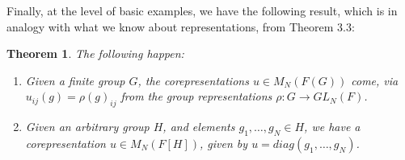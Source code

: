 \documentclass[12pt]{amsbook}
\newtheorem{theorem}{Theorem}[chapter]
\begin{document}
Finally, at the level of basic examples, we have the following result, which is in analogy with what we know about representations, from Theorem 3.3:

\begin{theorem}
The following happen:
\begin{enumerate}
\item Given a finite group $G$, the corepresentations $u\in M_N(F(G))$ come, via $u_{ij}(g)=\rho(g)_{ij}$ from the group representations $\rho:G\to GL_N(F)$.

\item Given an arbitrary group $H$, and elements $g_1,\ldots,g_N\in H$, we have a corepresentation $u\in M_N(F[H])$, given by $u=diag(g_1,\ldots,g_N)$.
\end{enumerate}
\end{theorem}
\end{document}
